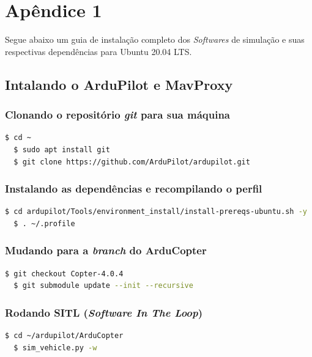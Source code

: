 \documentclass[12pt,a4paper,oneside]{book}
\begin{document}

%

%
%
\thispagestyle{myheadings}

%

%
%
%
%
\appendix
%
%
%
\chapter{Apêndice 1}
%
\thispagestyle{empty} 
%
Segue abaixo um guia de instalação completo dos \textit{Softwares} de simulação e suas respectivas dependências para Ubuntu 20.04 LTS.

\section{Intalando o ArduPilot e MavProxy}

\subsection{Clonando o repositório \textit{git} para sua máquina}
\begin{lstlisting}[language=bash]
  $ cd ~
  $ sudo apt install git
  $ git clone https://github.com/ArduPilot/ardupilot.git
\end{lstlisting}

\subsection{Instalando as dependências e recompilando o perfil}
\begin{lstlisting}[language=bash]
  $ cd ardupilot/Tools/environment_install/install-prereqs-ubuntu.sh -y
  $ . ~/.profile
\end{lstlisting}

\subsection{Mudando para a \textit{branch} do ArduCopter}
\begin{lstlisting}[language=bash]
  $ git checkout Copter-4.0.4
  $ git submodule update --init --recursive
\end{lstlisting}

\subsection{Rodando SITL (\textit{Software In The Loop})}
\begin{lstlisting}[language=bash]
  $ cd ~/ardupilot/ArduCopter
  $ sim_vehicle.py -w
\end{lstlisting}
\end{document}
